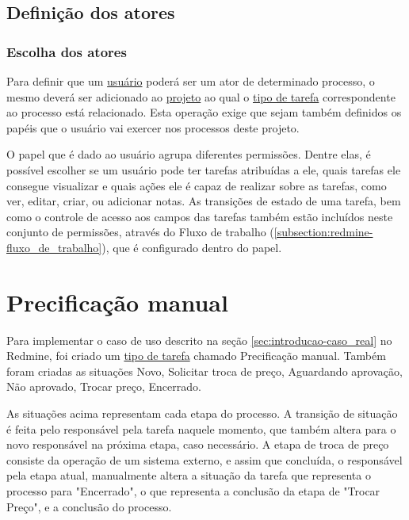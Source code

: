 \subsection{Definição dos atores}\label{subsection:redmine-automatizar_processo-atores}

\subsubsection{Escolha dos atores}

Para definir que um \underline{usuário} poderá ser um ator de determinado processo, o mesmo deverá ser adicionado ao \underline{projeto} ao qual o \underline{tipo de tarefa} correspondente ao processo está relacionado. Esta operação exige que sejam também definidos os papéis que o usuário vai exercer nos processos deste projeto.

O papel que é dado ao usuário agrupa diferentes permissões. Dentre elas, é possível escolher se um usuário pode ter tarefas atribuídas a ele, quais tarefas ele consegue visualizar e quais ações ele é capaz de realizar sobre as tarefas, como ver, editar, criar, ou adicionar notas. As transições de estado de uma tarefa, bem como o controle de acesso aos campos das tarefas também estão incluídos neste conjunto de permissões, através do Fluxo de trabalho (\ref{subsection:redmine-fluxo_de_trabalho}), que é configurado dentro do papel.

\section{Precificação manual}\label{sec:redmine-impl-caso-uso}

Para implementar o caso de uso descrito na seção \ref{sec:introducao-caso_real} no Redmine, foi criado um \underline{tipo de tarefa} chamado Precificação manual. Também foram criadas as situações Novo, Solicitar troca de preço, Aguardando aprovação, Não aprovado, Trocar preço, Encerrado.

As situações acima representam cada etapa do processo. A transição de situação é feita pelo responsável pela tarefa naquele momento, que também altera para o novo responsável na próxima etapa, caso necessário. A etapa de troca de preço consiste da operação de um sistema externo, e assim que concluída, o responsável pela etapa atual, manualmente altera a situação da tarefa que representa o processo para "Encerrado", o que representa a conclusão da etapa de "Trocar Preço", e a conclusão do processo.

